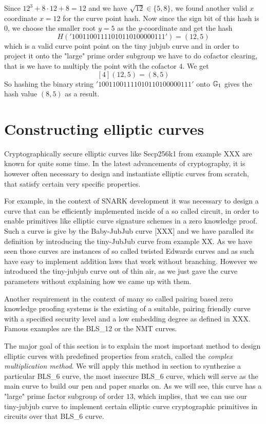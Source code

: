 \begin{example}
Since $12^3 + 8\cdot 12 + 8 = 12$ and we have $\sqrt{12}\in\{5, 8\}$, we found another valid $x$ coordinate $x=12$ for the curve point hash. Now since the sign bit of this hash is $0$, we choose the smaller root $y=5$ as the $y$-coordinate and get the hash 
$$
H('10011001111010110100000111') = (12,5)
$$
which is a valid curve point point on the tiny jubjub curve and in order to project it onto the "large" prime order subgroup we have to do cofactor clearing, that is we have to multiply the point with the cofactor $4$. We get
$$
[4](12,5) = (8,5)
$$
So hashing the binary string $'10011001111010110100000111'$ onto $\mathbb{G}_1$ gives the hash value $(8,5)$ as a result. 
\end{example}

\section{Constructing elliptic curves} Cryptographically secure elliptic curves like Secp256k1 from example XXX are known for quite some time. In the latest advancements of cryptography, it is however often necessary to design and instantiate elliptic curves from scratch, that satisfy certain very specific properties. 

For example, in the context of SNARK development it was necessary to design a curve that can be efficiently implemented incide of a so called circuit, in order to enable primitives like elliptic curve signature schemes in a zero knowledge proof. Such a curve is give by the Baby-JubJub curve [XXX] and we have paralled its definition by introducing the tiny-JubJub curve from example XX. As we have seen those curves are instances of so called twisted Edwards curves and as such have easy to implement addition laws that work without branching. However we introduced the tiny-jubjub curve out of thin air, as we just gave the curve parameters without explaining how we came up with them.

Another requirement in the context of many so called pairing based zero knowledge proofing systems is the existing of a suitable, pairing friendly curve with a specified security level and a low embedding degree as defined in XXX. Famous examples are the BLS\_12 or the NMT curves.

The major goal of this section is to explain the most important method to design elliptic curves with predefined properties from sratch, called the \textit{complex multiplication method}. We will apply this method in section to synthezise a particular BLS\_6 curve, the most insecure BLS\_6 curve, which will serve as the main curve to build our pen and paper snarks on. As we will see, this curve has a "large" prime factor subgroup of order $13$, which implies, that we can use our tiny-jubjub curve to implement certain elliptic curve cryptographic primitives in circuits over that BLS\_6 curve. 
 
